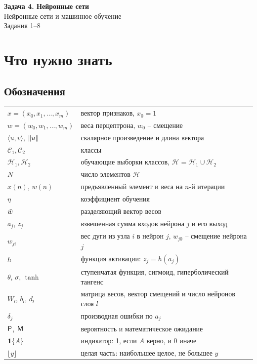 \documentclass[12pt,a4paper]{article}
\begin{document}
\begin{center}
  {\large\bfseries Задача 4. Нейронные сети}\\[1mm]
  Нейронные сети и машинное обучение\\[1mm]
  Задания 1--8
\end{center}

\section{Что нужно знать}

\subsection{Обозначения}

\begin{center}
\begin{tabular}{lp{}}
\toprule
$x = (x_0, x_1, \dots, x_m)$ & вектор признаков, $x_0 = 1$ \\
$w = (w_0, w_1, \dots, w_m)$ & веса перцептрона, $w_0$ -- смещение \\
$\langle u, v\rangle$, $\left\lVert u \right\rVert$ & скалярное произведение и длина вектора \\
$\mathcal{C}_1, \mathcal{C}_2$ & классы \\
$\mathcal{H}_1, \mathcal{H}_2$ & обучающие выборки классов,
  $\mathcal{H} = \mathcal{H}_1 \cup \mathcal{H}_2$ \\
$N$ & число элементов $\mathcal{H}$ \\
$x(n)$, $w(n)$ & предъявленный элемент и веса на $n$-й итерации \\
$\eta$ & коэффициент обучения \\
$\tilde{w}$ & разделяющий вектор весов \\
$a_j$, $z_j$ & взвешенная сумма входов нейрона $j$ и его выход \\
$w_{ji}$ & вес дуги из узла $i$ в нейрон $j$, $w_{j0}$ -- смещение нейрона $j$ \\
$h$ & функция активации: $z_j = h(a_j)$ \\
$\theta$, $\sigma$, $\tanh$ & ступенчатая функция, сигмоид, гиперболический тангенс \\
$W_l$, $b_l$, $d_l$ & матрица весов, вектор смещений и число нейронов слоя $l$ \\
$\delta_j$ & производная ошибки по $a_j$ \\
$\mathsf{P}$, $\mathsf{M}$ & вероятность и математическое ожидание \\
$\mathbf{1}\{A\}$ & индикатор: 1, если $A$ верно, и 0 иначе \\
$\lfloor y\rfloor$ & целая часть: наибольшее целое, не большее $y$ \\
\bottomrule
\end{tabular}
\end{center}
\end{document}
